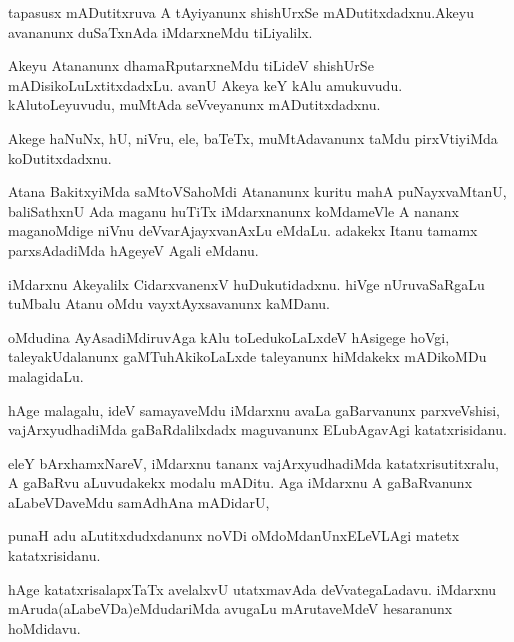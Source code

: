 \documentclass{article}
\begin{document}
\begin{mn}
tapasusx mADutitxruva A tAyiyanunx shishUrxSe mADutitxdadxnu.Akeyu avananunx 
duSaTxnAda iMdarxneMdu tiLiyalilx.
\end{mn}

\begin{mn}
Akeyu Atananunx dhamaRputarxneMdu tiLideV shishUrSe mADisikoLuLxtitxdadxLu.  
avanU Akeya keY kAlu amukuvudu. kAlutoLeyuvudu, muMtAda seVveyanunx mADutitxdadxnu. 
\end{mn}

\begin{mn}
Akege haNuNx, hU, niVru, ele, baTeTx, muMtAdavanunx taMdu pirxVtiyiMda koDutitxdadxnu. 
\end{mn}

\begin{mn}
Atana BakitxyiMda  saMtoVSahoMdi Atananunx kuritu mahA puNayxvaMtanU, 
baliSathxnU Ada maganu huTiTx iMdarxnanunx koMdameVle A nananx maganoMdige 
niVnu deVvarAjayxvanAxLu eMdaLu.  adakekx Itanu  tamamx parxsAdadiMda hAgeyeV Agali eMdanu.
\end{mn}

\begin{mn}
iMdarxnu Akeyalilx CidarxvanenxV huDukutidadxnu.  hiVge nUruvaSaRgaLu  
tuMbalu Atanu oMdu vayxtAyxsavanunx kaMDanu. 
\end{mn}

\begin{mn}
oMdudina AyAsadiMdiruvAga  kAlu toLedukoLaLxdeV hAsigege hoVgi, taleyakUdalanunx 
gaMTuhAkikoLaLxde taleyanunx hiMdakekx mADikoMDu malagidaLu.
\end{mn}

\begin{mn}
hAge malagalu, ideV samayaveMdu iMdarxnu avaLa gaBarvanunx parxveVshisi, 
vajArxyudhadiMda  gaBaRdalilxdadx maguvanunx ELubAgavAgi katatxrisidanu.
\end{mn}

\begin{mn}
eleY bArxhamxNareV, iMdarxnu tananx vajArxyudhadiMda katatxrisutitxralu, 
A gaBaRvu aLuvudakekx modalu mADitu.  Aga iMdarxnu  A gaBaRvanunx aLabeVDaveMdu 
samAdhAna mADidarU,
\end{mn}

\begin{mn}
punaH adu aLutitxdudxdanunx noVDi oMdoMdanUnxELeVLAgi matetx katatxrisidanu.
\end{mn}

\begin{mn}
hAge katatxrisalapxTaTx avelalxvU utatxmavAda deVvategaLadavu. iMdarxnu 
mAruda(aLabeVDa)eMdudariMda avugaLu mArutaveMdeV hesaranunx hoMdidavu.
\end{mn}
\end{document}
